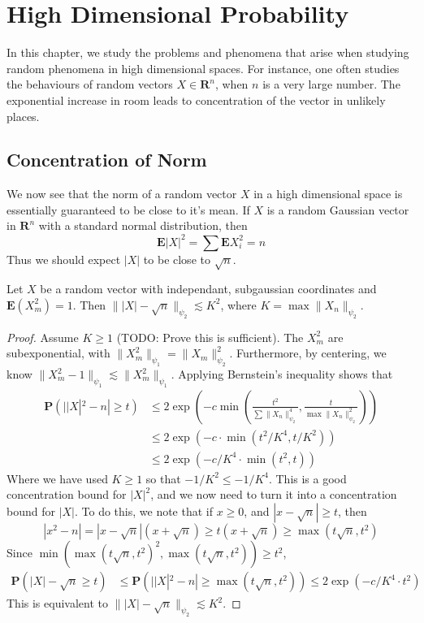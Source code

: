 \chapter{High Dimensional Probability}

In this chapter, we study the problems and phenomena that arise when studying random phenomena in high dimensional spaces. For instance, one often studies the behaviours of random vectors $X \in \mathbf{R}^n$, when $n$ is a very large number. The exponential increase in room leads to concentration of the vector in unlikely places.

\section{Concentration of Norm}

We now see that the norm of a random vector $X$ in a high dimensional space is essentially guaranteed to be close to it's mean. If $X$ is a random Gaussian vector in $\mathbf{R}^n$ with a standard normal distribution, then
%
\[ \mathbf{E} |X|^2 = \sum \mathbf{E} X_i^2 = n \]
%
Thus we should expect $|X|$ to be close to $\sqrt{n}$.

\begin{theorem}
    Let $X$ be a random vector with independant, subgaussian coordinates and $\mathbf{E}(X_m^2) = 1$. Then $\| |X| - \sqrt{n} \|_{\psi_2} \lesssim K^2$, where $K = \max \| X_n \|_{\psi_2}$.
\end{theorem}
\begin{proof}
    Assume $K \geq 1$ (TODO: Prove this is sufficient). The $X_m^2$ are subexponential, with $\| X_m^2 \|_{\psi_1} = \| X_m \|_{\psi_2}^2$. Furthermore, by centering, we know $\| X_m^2 - 1 \|_{\psi_1} \lesssim \| X_m^2 \|_{\psi_1}$. Applying Bernstein's inequality shows that
    \begin{align*}
        \mathbf{P} \left( ||X|^2 - n| \geq t \right) &\leq 2 \exp \left( -c \min \left( \frac{t^2}{\sum \| X_n \|_{\psi_2}^4}, \frac{t}{\max \| X_n \|_{\psi_2}^2} \right) \right)\\
        &\leq 2 \exp \left( -c \cdot \min \left( t^2 / K^4 , t/K^2 \right) \right)\\
        &\leq 2 \exp(-c/K^4 \cdot \min(t^2,t))
    \end{align*}
    Where we have used $K \geq 1$ so that $-1/K^2 \leq -1/K^4$. This is a good concentration bound for $|X|^2$, and we now need to turn it into a concentration bound for $|X|$. To do this, we note that if $x \geq 0$, and $|x - \sqrt{n}| \geq t$, then
    \[ |x^2 - n| = |x-\sqrt{n}|(x+\sqrt{n}) \geq t(x+\sqrt{n}) \geq \max(t \sqrt{n},t^2) \]
    Since $\min(\max(t\sqrt{n},t^2)^2,\max(t\sqrt{n},t^2)) \geq t^2$,
    \begin{align*}
        \mathbf{P} \left( |X| - \sqrt{n} \geq t \right) &\leq \mathbf{P} \left( | |X|^2 - n | \geq \max(t \sqrt{n}, t^2) \right) \leq 2 \exp \left( - c/K^4 \cdot t^2 \right)
    \end{align*}
    This is equivalent to $\| |X| - \sqrt{n} \|_{\psi_2} \lesssim K^2$.
\end{proof}

